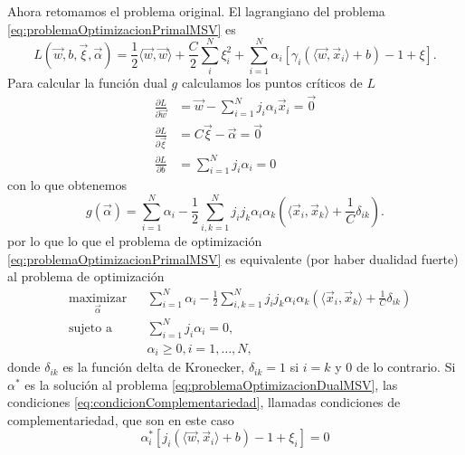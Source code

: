 \documentclass[letterpaper,12pt]{book}
\begin{document}
Ahora retomamos el problema original. El lagrangiano del problema \ref{eq:problemaOptimizacionPrimalMSV} es 
\begin{equation}
  L(\vec{w},b,\vec{\xi},\vec{\alpha}) = \frac{1}{2}\langle \vec{w}, \vec{w} \rangle + \frac{C}{2}\sum_{i}^{N}\xi_i^2 + \sum_{i=1}^{N}\alpha_i\left[\gamma_i(\langle \vec{w}, \vec{x}_i \rangle +b) -1 + \xi \right].
\end{equation}
Para calcular la función dual $g$ calculamos los puntos críticos de $L$
\begin{align}
    \frac{\partial L}{\partial\vec{w}} & = \vec{w} - \sum_{i=1}^{N}j_i\alpha_i\vec{x}_i = \vec{0}\label{eq:vectorPesoEnVarsDuales}\\
    \frac{\partial L}{\partial\vec{\xi}} & = C\vec{\xi}-\vec{\alpha} = \vec{0}\label{eq:alphaYXi}\\
    \frac{\partial L}{\partial b} & = \sum_{i=1}^{N}j_i\alpha_i = 0
\end{align}
con lo que obtenemos 
\begin{equation}
g(\vec{\alpha}) = \sum_{i=1}^N \alpha_i -\frac{1}{2}\sum_{i,k=1}^Nj_ij_k\alpha_i\alpha_k\left( \langle\vec{x}_i, \vec{x}_k\rangle + \frac{1}{C}\delta_{ik}  \right).
\end{equation}
por lo que lo que el problema de optimización \ref{eq:problemaOptimizacionPrimalMSV} es equivalente (por haber dualidad fuerte) al problema de optimización
\begin{equation}\label{eq:problemaOptimizacionDualMSV}
  \begin{aligned}
    & \underset{\vec{\alpha}}{\text{maximizar}}
    & & \sum_{i=1}^N \alpha_i -\frac{1}{2}\sum_{i,k=1}^Nj_ij_k\alpha_i\alpha_k\left( \langle\vec{x}_i, \vec{x}_k\rangle + \frac{1}{C}\delta_{ik}  \right)\\
    & \text{sujeto a}
    & & \sum_{i=1}^Nj_i\alpha_i = 0, \\
    & & & \alpha_i \geq 0, i = 1,\dots,N,
  \end{aligned}
\end{equation}
donde $\delta_{ik}$ es la función delta de Kronecker, $\delta_{ik} = 1$ si $i=k$ y $0$ de lo contrario. Si $\alpha^*$ es la solución al problema \ref{eq:problemaOptimizacionDualMSV}, las condiciones \ref{eq:condicionComplementariedad}, llamadas condiciones de complementariedad, que son en este caso 
\begin{equation}\label{eq:condicionComplementariedadMSV}
\alpha_{i}^{*}[j_i(\langle\vec{w},\vec{x}_i\rangle+b)-1+\xi_i] = 0
\end{equation}
\end{document}
